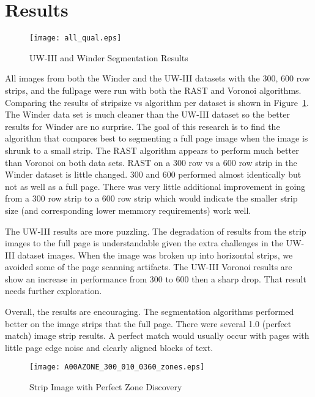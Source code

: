 \documentclass[conference]{IEEEtran}
\begin{document}
\section{Results}

\begin{figure}[all-qualitative]
\texttt{[image: all\_qual.eps]}
\caption{UW-III and Winder Segmentation Results}
\label{fig:all-qualitative}
\end{figure}

All images from both the Winder and the UW-III datasets with 
the 300, 600 row strips, and the fullpage were run with both the RAST and
Voronoi algorithms. Comparing the results of stripsize vs algorithm per dataset
is shown in Figure~\ref{fig:all-qualitative}. The Winder data set is much
cleaner than the UW-III dataset so the better results for Winder are no
surprise. The goal of this research is to find the algorithm that compares best
to segmenting a full page image when the image is shrunk to a small strip. The
RAST algorithm appears to perform much better than Voronoi on both data sets.
RAST on a 300 row vs a 600 row strip in the Winder dataset is little changed.
300 and 600 performed almost identically but not as well as a full page. There
was very little additional improvement in going from a 300 row strip to a 600
row strip which would indicate the smaller strip size (and corresponding lower
memmory requirements) work well.

The UW-III results are more puzzling. The degradation of results from the
strip images to the full page is understandable given the extra challenges in
the UW-III dataset images. When the image was broken up into horizontal strips,
we avoided some of the page scanning artifacts. The UW-III Voronoi results are
show an increase in performance from 300 to 600 then a sharp drop. That result
needs further exploration.

Overall, the results are encouraging. The segmentation algorithms performed
better on the image strips that the full page. There were several 1.0 (perfect
match) image strip results. A perfect match would usually occur with
pages with little page edge noise and clearly aligned blocks of text.  

\begin{figure}[strip-image-showing-perfect-hit]
\texttt{[image: A00AZONE\_300\_010\_0360\_zones.eps]}
\caption{Strip Image with Perfect Zone Discovery}
\label{fig:strip-image-showing-perfect-hit}
\end{figure}
\end{document}
